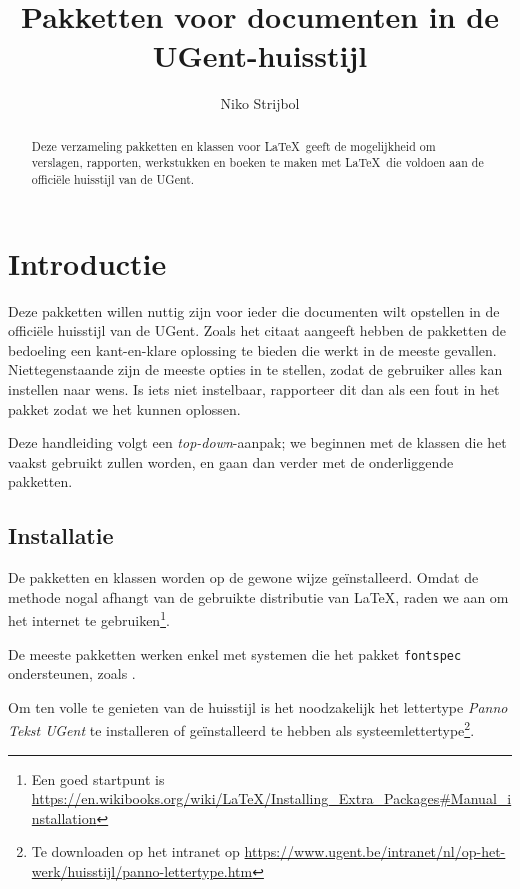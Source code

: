 \documentclass[11pt,parskip=half-]{scrartcl}
\title{Pakketten voor documenten in de UGent-huisstijl}
\author{Niko Strijbol}
\newcommand*{\LuaLaTeX}{\hologo{LuaLaTeX}}
\begin{document}
    \maketitle

    \begin{abstract}
        \noindent Deze verzameling pakketten en klassen voor \LaTeX\ geeft de mogelijkheid om verslagen, rapporten, werkstukken en boeken te maken met \LaTeX\ die voldoen aan de officiële huisstijl van de UGent.
    \end{abstract}

    \tableofcontents

    \section{Introductie}\label{sec:introductie}


    Deze pakketten willen nuttig zijn voor ieder die documenten wilt opstellen in de officiële huisstijl van de UGent. Zoals het citaat aangeeft hebben de pakketten de bedoeling een kant-en-klare oplossing te bieden die werkt in de meeste gevallen. Niettegenstaande zijn de meeste opties in te stellen, zodat de gebruiker alles kan instellen naar wens. Is iets niet instelbaar, rapporteer dit dan als een fout in het pakket zodat we het kunnen oplossen.

    Deze handleiding volgt een \emph{top-down}-aanpak; we beginnen met de klassen die het vaakst gebruikt zullen worden, en gaan dan verder met de onderliggende pakketten.

    \subsection{Installatie}\label{subsec:installatie}
    De pakketten en klassen worden op de gewone wijze geïnstalleerd. Omdat de methode nogal afhangt van de gebruikte distributie van \LaTeX, raden we aan om het internet te gebruiken\footnote{Een goed startpunt is \url{https://en.wikibooks.org/wiki/LaTeX/Installing_Extra_Packages\#Manual_installation}}.

    De meeste pakketten werken enkel met systemen die het pakket \texttt{fontspec} ondersteunen, zoals \LuaLaTeX.

    Om ten volle te genieten van de huisstijl is het noodzakelijk het lettertype \emph{Panno Tekst UGent} te installeren of geïnstalleerd te hebben als systeemlettertype\footnote{Te downloaden op het intranet op \url{https://www.ugent.be/intranet/nl/op-het-werk/huisstijl/panno-lettertype.htm} }.
\end{document}

